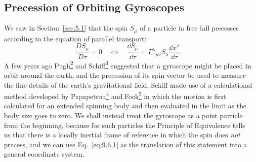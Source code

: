 %

\subsection{Precession of Orbiting Gyroscopes}\label{sec:9.6}

We saw in Section~\ref{sec:5.1} that the spin \(S_\mu\) of a particle in
free fall precesses according to the equation of parallel transport:
\begin{equation}
  \frac{D S_\mu}{D\tau}=0
  \quad\Longleftrightarrow\quad
  \frac{\dd S_\mu}{\dd\tau}
  =
  \Gamma^\lambda{}_{\mu\nu}S_\lambda
  \frac{\dd x^\nu}{\dd\tau}.
  \tag{9.6.1}\label{eq:9.6.1}
\end{equation}
A few years ago Pugh\hyperref[ch9-ref-2]{\textsuperscript{2}} and
Schiff\hyperref[ch9-ref-3]{\textsuperscript{3}} suggested that a gyroscope
might be placed in orbit around the earth, and the precession of its spin
vector be used to measure the fine details of the earth's gravitational
field. Schiff made use of a calculational method developed by
Papapetrou\hyperref[ch9-ref-4]{\textsuperscript{4}} and
Fock\hyperref[ch9-ref-5]{\textsuperscript{5}} in which the motion is first
calculated for an extended spinning body and then evaluated in the limit as
the body size goes to zero. We shall instead treat the gyroscope as a point
particle from the beginning, because for such particles the Principle of
Equivalence tells us that there is a locally inertial frame of reference in
which the spin does \emph{not} precess, and we can use
Eq.~\eqref{eq:9.6.1} as the translation of this statement into a general
coordinate system.

